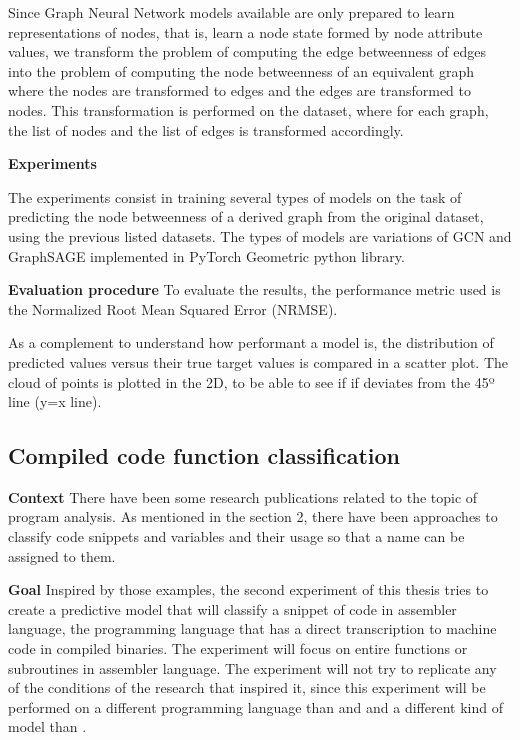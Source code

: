 Since Graph Neural Network models available are only prepared to learn representations of nodes, that is, learn a node state formed by node attribute values, we transform the problem of computing the edge betweenness of edges into the problem of computing the node betweenness of an equivalent graph where the nodes are transformed to edges and the edges are transformed to nodes. This transformation is performed on the dataset, where for each graph, the list of nodes and the list of edges is transformed accordingly. 

\textbf{Experiments}

The experiments consist in training several types of models on the task of predicting the node betweenness of a derived graph from the original dataset, using the previous listed  datasets. The types of models are variations of GCN and GraphSAGE implemented in PyTorch Geometric python library.

\textbf{Evaluation procedure}
To evaluate the results, the performance metric used is the Normalized Root Mean Squared Error (NRMSE). 

As a complement to understand how performant a model is, the distribution of predicted values versus their true target values is compared in a scatter plot. The cloud of points is plotted in the 2D, to be able to see if if deviates from the 45º line (y=x line). 


\subsection{Compiled code function classification}

\textbf{Context}
There have been some research publications related to the topic of program analysis. As mentioned in the section 2, there have been approaches to classify code snippets \cite{code2vec} and variables \cite{139} and their usage so that a name can be assigned to them. 

\textbf{Goal}
Inspired by those examples, the second experiment of this thesis tries to create a predictive model that will classify a snippet of code in assembler language, the programming language that has a direct transcription to machine code in compiled binaries. The experiment will focus on entire functions or subroutines in assembler language. The experiment will not try to replicate any of the conditions of the research that inspired it, since this experiment will be performed on a different programming language than \cite{139} and \cite{code2vec} and a different kind of model than \cite{code2vec}.

